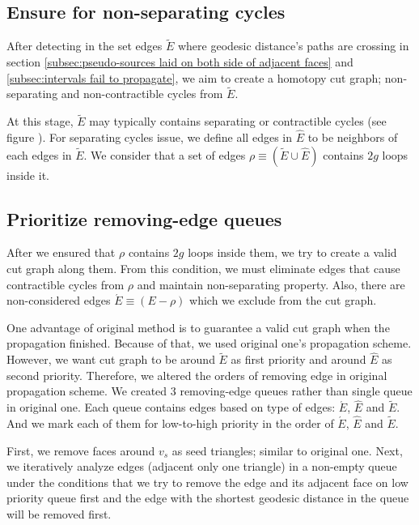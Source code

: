 \documentclass[a4paper,twoside]{article}
\begin{document}
\subsection{Ensure for non-separating cycles}
\label{subsec:ensure non-trivia}
After detecting in the set edges $\tilde{E}$ where geodesic distance's paths are crossing in section \ref{subsec:pseudo-sources laid on both side of adjacent faces} and \ref{subsec:intervals fail to propagate}, we aim to create a homotopy cut graph; non-separating and non-contractible cycles from $\tilde{E}$.

At this stage, $\tilde{E}$ may typically contains separating or contractible cycles (see figure ).  For separating cycles issue, we define all edges in $\hat{E}$ to be neighbors of each edges in $\tilde{E}$. We consider that a set of edges $\rho \equiv (\tilde{E} \cup \hat{E})$ contains $2g$ loops inside it.  

\subsection{Prioritize removing-edge queues}
After we ensured that $\rho$ contains $2g$ loops inside them, we try to create a valid cut graph along them. From this condition, we must eliminate edges that cause contractible cycles from $\rho$ and maintain non-separating property. Also, there are non-considered edges $\acute{E} \equiv (E - \rho)$ which we exclude from the cut graph.

One advantage of original method is to guarantee a valid cut graph when the propagation finished. Because of that, we used original one's propagation scheme. However, we want cut graph to be around $\tilde{E}$ as first priority and around $\hat{E}$ as second priority. Therefore, we altered the orders of removing edge in original propagation scheme. We created 3 removing-edge queues rather than single queue in original one. Each queue contains edges based on type of edges: 
$\acute{E}$, $\hat{E}$ and $\tilde{E}$.  And we mark each of them for low-to-high priority in the order of $\acute{E}$, $\hat{E}$ and $\tilde{E}$.

First, we remove faces around $v_s$ as seed triangles; similar to original one. Next, we iteratively analyze edges (adjacent only one triangle) in a non-empty queue under the conditions that we try to remove the edge and its adjacent face on low priority queue first and the edge with the shortest geodesic distance in the queue will be removed first.
\end{document}
